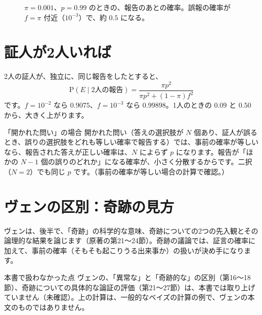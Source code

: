 \documentclass[a4paper,11pt,openany]{ltjsbook}
\newcommand{\Prob}{\mathrm{P}}
\begin{document}
\begin{figure}[htbp]
\centering
{}
\caption{$\pi=0.001$、$p=0.99$ のときの、報告のあとの確率。誤報の確率が $f=\pi$ 付近（$10^{-3}$）で、約 $0.5$ になる。}
\end{figure}

\section{証人が2人いれば}

2人の証人が、独立に、同じ報告をしたとすると、
\[
\Prob(E\mid\text{2人の報告})=\frac{\pi p^2}{\pi p^2+(1-\pi)f^2}
\]
です。$f=10^{-2}$ なら $0.9075$、$f=10^{-3}$ なら $0.99898$。1人のときの $0.09$ と $0.50$ から、大きく上がります。

\begin{examplebox}{「開かれた問い」の場合}
開かれた問い（答えの選択肢が $N$ 個あり、証人が誤るとき、誤りの選択肢をどれも等しい確率で報告する）では、事前の確率が等しいなら、報告された答えが正しい確率は、$N$ によらず $p$ になります。報告が「ほかの $N-1$ 個の誤りのどれか」になる確率が、小さく分散するからです。二択（$N=2$）でも同じ $p$ です。（事前の確率が等しい場合の計算で確認。）
\end{examplebox}

\section{ヴェンの区別：奇跡の見方}

ヴェンは、後半で、「奇跡」の科学的な意味、奇跡についての2つの先入観とその論理的な結果を論じます（原著の第21〜24節）。奇跡の議論では、証言の確率に加えて、事前の確率（そもそも起こりうる出来事か）の扱いが決め手になります。

\begin{notebox}{本書で扱わなかった点}
ヴェンの、「異常な」と「奇跡的な」の区別（第16〜18節）、奇跡についての具体的な論証の評価（第21〜27節）は、本書では取り上げていません（未確認）。上の計算は、一般的なベイズの計算の例で、ヴェンの本文のものではありません。
\end{notebox}
\end{document}
